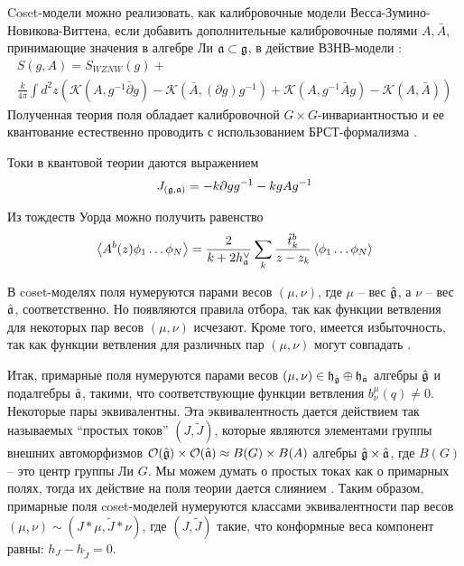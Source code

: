 Coset-модели можно реализовать, как калибровочные модели Весса-Зумино-Новикова-Виттена, если добавить дополнительные калибровочные полями  $A, \bar{A}$, принимающие значения в алгебре Ли $\mathfrak{a}\subset \mathfrak{g}$, в действие ВЗНВ-модели  \cite{gawdzki1988g}:
\begin{multline}
  \label{eq:38}
      S(g,A)=S_{WZNW}(g)+\\
      \frac{k}{4\pi}\int d^{2}z \left(\mathcal{K}(A, g^{-1}\bar \partial g)-\mathcal{K}(\bar A, (\partial g ) g^{-1})+\mathcal{K}(A,g^{-1}\bar A g)-\mathcal{K}(A,\bar A)\right)
\end{multline}
Полученная теория поля обладает калибровочной $G\times G$-инвариантностью  и ее квантование естественно проводить с использованием БРСТ-формализма \cite{hwang1993brst}. 

Токи в квантовой теории даются выражением
\begin{equation}
  \label{eq:39}
  J_{(\mathfrak{g},\mathfrak{a})}=-k\partial g g^{-1} -k g A g^{-1}
\end{equation}

Из тождеств Уорда можно получить равенство
\begin{equation*}
  \left< A^{b}(z)\phi_{1}\dots \phi_{N}\right>=\frac{2}{k+2 h^{\vee}_{\mathfrak{a}}}\sum_{k}\frac{\tilde{t}^{b}_{k}}{z-z_{k}}\left<\phi_{1}\dots \phi_{N}\right>
\end{equation*}

В coset-моделях поля нумеруются парами весов  $(\mu,\nu)$, где $\mu$ -- вес  $\hat{\mathfrak{g}}$, а $\nu$ -- вес $\hat{\mathfrak{a}}$, соответственно. Но появляются правила отбора, так как функции ветвления для некоторых пар весов  $(\mu,\nu)$ исчезают. Кроме того, имеется избыточность, так как функции ветвления для различных пар $(\mu,\nu)$ могут совпадать \cite{fuchs1996resolution,schellekens1990field}.

Итак, примарные поля нумеруются парами весов  $(\mu,\nu)\in \mathfrak{h}_{\hat{\mathfrak{g}}}\oplus \mathfrak{h}_{\hat{\mathfrak{a}}}$ алгебры $\hat{\mathfrak{g}}$ и подалгебры $\hat{\mathfrak{a}}$, такими, что соответствующие функции ветвления $b^{\mu}_{\nu}(q)\neq 0$. Некоторые пары эквивалентны. Эта эквивалентность дается действием так называемых ``простых токов'' $(J,\tilde{J})$, которые являются элементами группы внешних автоморфизмов  $\mathcal{O}(\hat{\mathfrak{g}})\times \mathcal{O}(\hat{\mathfrak{a}})\approx B(G)\times B(A)$ алгебры $\hat{\mathfrak{g}}\times\hat{\mathfrak{a}}$, где $B(G)$ -- это центр группы Ли $G$. Мы можем думать о простых токах как о примарных полях, тогда их действие на поля теории дается слиянием \cite{difrancesco1997cft}. Таким образом, примарные поля coset-моделей нумеруются классами эквивалентности пар весов  $(\mu,\nu)\sim (J*\mu,\tilde{J}*\nu)$, где $(J,\tilde J)$ такие, что  конформные веса компонент равны:  $h_{J}-h_{\tilde{J}}=0$. 

